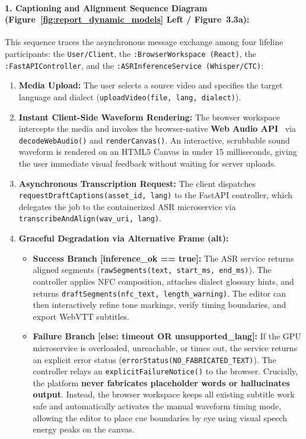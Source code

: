 \documentclass[a4paper,11pt]{article}
\begin{document}
\paragraph{1. Captioning and Alignment Sequence Diagram (Figure~\ref{fig:report_dynamic_models} Left / Figure~3.3a):}
This sequence traces the asynchronous message exchange among four lifeline participants: the \texttt{User/Client}, the \texttt{:BrowserWorkspace (React)}, the \texttt{:FastAPIController}, and the \texttt{:ASRInferenceService (Whisper/CTC)}:
\begin{enumerate}
    \item \textbf{Media Upload:} The user selects a source video and specifies the target language and dialect (\texttt{uploadVideo(file, lang, dialect)}).
    \item \textbf{Instant Client-Side Waveform Rendering:} The browser workspace intercepts the media and invokes the browser-native \textbf{Web Audio API}~\cite{w3c2021webaudio} via \texttt{decodeWebAudio()} and \texttt{renderCanvas()}. An interactive, scrubbable sound waveform is rendered on an HTML5 Canvas in under 15 milliseconds, giving the user immediate visual feedback without waiting for server uploads.
    \item \textbf{Asynchronous Transcription Request:} The client dispatches \texttt{requestDraftCaptions(asset\_id, lang)} to the FastAPI controller, which delegates the job to the containerized ASR microservice via \texttt{transcribeAndAlign(wav\_uri, lang)}.
    \item \textbf{Graceful Degradation via Alternative Frame (alt):}
    \begin{itemize}
        \item \textbf{Success Branch [inference\_ok == true]:} The ASR service returns aligned segments (\texttt{rawSegments(text, start\_ms, end\_ms)}). The controller applies NFC composition, attaches dialect glossary hints, and returns \texttt{draftSegments(nfc\_text, length\_warning)}. The editor can then interactively refine tone markings, verify timing boundaries, and export WebVTT subtitles.
        \item \textbf{Failure Branch [else: timeout OR unsupported\_lang]:} If the GPU microservice is overloaded, unreachable, or times out, the service returns an explicit error status (\texttt{errorStatus(NO\_FABRICATED\_TEXT)}). The controller relays an \texttt{explicitFailureNotice()} to the browser. Crucially, the platform \textbf{never fabricates placeholder words or hallucinates output}. Instead, the browser workspace keeps all existing subtitle work safe and automatically activates the manual waveform timing mode, allowing the editor to place cue boundaries by eye using visual speech energy peaks on the canvas.
    \end{itemize}
\end{enumerate}
\end{document}
